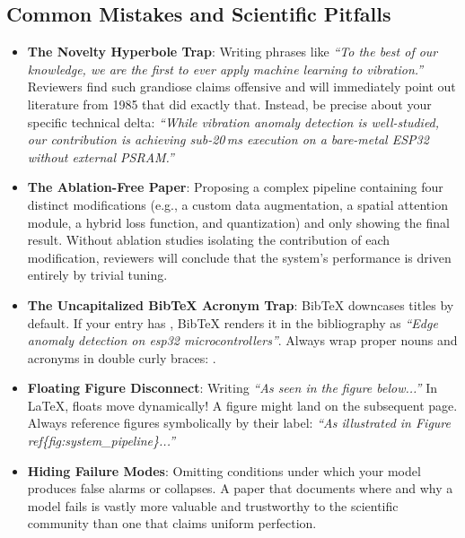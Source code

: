 \subsection{Common Mistakes and Scientific Pitfalls}\label{subsec:writing_pitfalls}

\begin{warning}
\begin{itemize}
    \item \textbf{The Novelty Hyperbole Trap}:
    Writing phrases like \emph{``To the best of our knowledge, we are the first to ever apply machine learning to vibration.''} Reviewers find such grandiose claims offensive and will immediately point out literature from 1985 that did exactly that. Instead, be precise about your specific technical delta: \emph{``While vibration anomaly detection is well-studied, our contribution is achieving sub-20\,ms execution on a bare-metal ESP32 without external PSRAM.''}
    \item \textbf{The Ablation-Free Paper}:
    Proposing a complex pipeline containing four distinct modifications (e.g., a custom data augmentation, a spatial attention module, a hybrid loss function, and quantization) and only showing the final result. Without ablation studies isolating the contribution of each modification, reviewers will conclude that the system's performance is driven entirely by trivial tuning.
    \item \textbf{The Uncapitalized Bib\TeX{} Acronym Trap}:
    Bib\TeX{} downcases titles by default. If your  entry has , Bib\TeX{} renders it in the bibliography as \emph{``Edge anomaly detection on esp32 microcontrollers''}. Always wrap proper nouns and acronyms in double curly braces: .
    \item \textbf{Floating Figure Disconnect}:
    Writing \emph{``As seen in the figure below...''} In \LaTeX{}, floats move dynamically! A figure might land on the subsequent page. Always reference figures symbolically by their label: \emph{``As illustrated in Figure~\\ref\{fig:system\_pipeline\}...''}
    \item \textbf{Hiding Failure Modes}:
    Omitting conditions under which your model produces false alarms or collapses. A paper that documents where and why a model fails is vastly more valuable and trustworthy to the scientific community than one that claims uniform perfection.
\end{itemize}
\end{warning}

